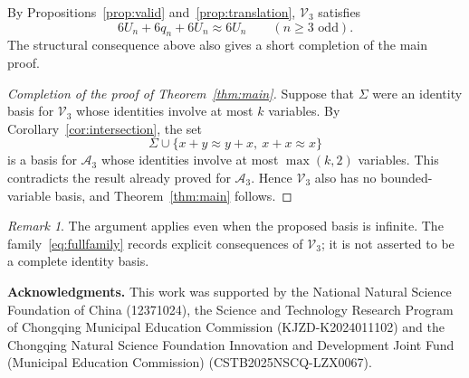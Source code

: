 \documentclass[11pt,reqno]{amsart}
\numberwithin{equation}{section}
\theoremstyle{definition}
\theoremstyle{remark}
\newtheorem{remark}[theorem]{Remark}
\newcommand{\Vthree}{\mathcal V_3}
\newcommand{\Athree}{\mathcal A_3}
\newcommand{\eqid}{\approx}
\begin{document}
By Propositions~\ref{prop:valid} and~\ref{prop:translation},
$\Vthree$ satisfies
\begin{equation}\label{eq:fullfamily}
6U_n+6q_n+6U_n\eqid6U_n
\qquad(n\geq3\text{ odd}).
\end{equation}
The structural consequence above also gives a short completion
of the main proof.

\begin{proof}[Completion of the proof of Theorem~\ref{thm:main}]
Suppose that $\Sigma$ were an identity basis for
$\Vthree$ whose identities involve at most $k$
variables. By Corollary~\ref{cor:intersection}, the set
\[
\Sigma\cup\{x+y\eqid y+x,\ x+x\eqid x\}
\]
is a basis for $\Athree$ whose identities involve at most
$\max(k,2)$ variables. This contradicts the result already
proved for $\Athree$. Hence $\Vthree$ also has no bounded-variable
basis, and Theorem~\ref{thm:main} follows.
\end{proof}

\begin{remark}
The argument applies even when the proposed basis is infinite.
The family~\eqref{eq:fullfamily} records explicit consequences of
$\Vthree$; it is not asserted to be a complete identity basis.
\end{remark}

\smallskip
\noindent\textbf{Acknowledgments.}
This work was supported by the National Natural Science Foundation of China (12371024), the Science and Technology Research Program of Chongqing Municipal Education Commission (KJZD-K2024011102) and the Chongqing Natural Science Foundation Innovation and Development Joint Fund (Municipal Education Commission) (CSTB2025NSCQ-LZX0067).
\end{document}
